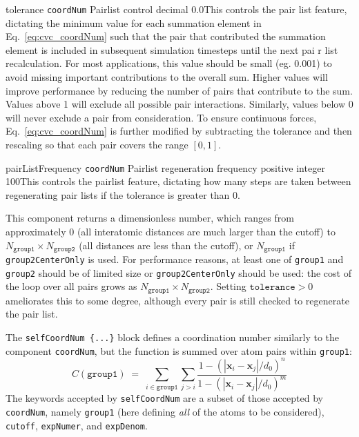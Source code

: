 \begin{cvcoptions}
\item %
    \keydef
     {tolerance}{%
     \texttt{coordNum}}{%
     Pairlist control}{%
    decimal}{%
    0.0}{This controls the pair  list feature, dictating the minimum value for each summation element in Eq.~\ref{eq:cvc_coordNum} such that the pair that contributed the summation element is included in subsequent simulation timesteps until the next pai r list recalculation. For most applications, this value should be small (eg. 0.001) to avoid missing important contributions to the overall sum. Higher values will improve performance by reducing the number of pairs that contribute to the sum. Values above 1 will exclude all possible pair interactions. Similarly, values below 0 will never exclude a pair from consideration. To ensure continuous forces, Eq.~\ref{eq:cvc_coordNum} is further modified by subtracting the tolerance and then rescaling so that each pair covers the range $\left[0, 1\right]$.
  }

\item %
    \keydef
     {pairListFrequency}{%
     \texttt{coordNum}}{%
     Pairlist regeneration frequency}{%
    positive integer}{%
    100}{This controls the pairlist feature, dictating how many steps are taken between regenerating pair  lists if the tolerance is greater than 0.
  }
\end{cvcoptions}

This component returns a dimensionless number, which ranges from
approximately 0 (all interatomic distances are much larger than the
cutoff) to $N_{\mathtt{group1}} \times N_{\mathtt{group2}}$ (all distances
are less than the cutoff), or $N_{\mathtt{group1}}$ if
\texttt{group2CenterOnly} is used.  For performance reasons, at least
one of \texttt{group1} and \texttt{group2} should be of limited size or \texttt{group2CenterOnly} should be used: the cost of the loop over all pairs grows as $N_{\mathtt{group1}} \times N_{\mathtt{group2}}$.
Setting $\mathtt{tolerance} > 0$ ameliorates this to some degree, although every pair is still checked to regenerate the pair  list.




The \texttt{selfCoordNum \{...\}} block defines
a coordination number similarly to the component \texttt{coordNum},
but the function is summed over atom pairs within \texttt{group1}:
\begin{equation}
  \label{eq:cvc_selfCoordNum}
  C (\mathtt{group1}) \; = \;
  \sum_{i\in\mathtt{group1}}\sum_{j > i} {
    \frac{1 - (|\mathbf{x}_{i}-\mathbf{x}_{j}|/d_{0})^{n}}{
      1 - (|\mathbf{x}_{i}-\mathbf{x}_{j}|/d_{0})^{m} }
  }
\end{equation}
The keywords accepted by \texttt{selfCoordNum} are a subset of
those accepted by \texttt{coordNum}, namely \texttt{group1}
(here defining \emph{all} of the atoms to be considered),
\texttt{cutoff}, \texttt{expNumer}, and \texttt{expDenom}.

